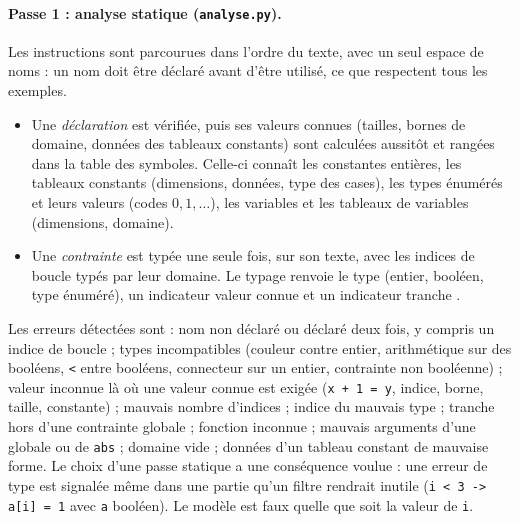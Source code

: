 \documentclass[11pt,a4paper]{article}
\newcommand{\code}[1]{\texttt{#1}}
\begin{document}
\paragraph{Passe 1 : analyse statique (\code{analyse.py}).} Les instructions sont parcourues
dans l'ordre du texte, avec un seul espace de noms : un nom doit être déclaré avant d'être
utilisé, ce que respectent tous les exemples.
\begin{itemize}
  \item Une \emph{déclaration} est vérifiée, puis ses valeurs connues (tailles, bornes de
        domaine, données des tableaux constants) sont calculées aussitôt et rangées dans la
        table des symboles. Celle-ci connaît les constantes entières, les tableaux constants
        (dimensions, données, type des cases), les types énumérés et leurs valeurs (codes
        $0, 1, \dots$), les variables et les tableaux de variables (dimensions, domaine).
  \item Une \emph{contrainte} est typée une seule fois, sur son texte, avec les indices de
        boucle typés par leur domaine. Le typage renvoie le type (entier, booléen, type
        énuméré), un indicateur \og valeur connue \fg{} et un indicateur \og tranche \fg.
\end{itemize}
Les erreurs détectées sont : nom non déclaré ou déclaré deux fois, y compris un indice de
boucle ; types incompatibles (couleur contre entier, arithmétique sur des booléens,
\code{<} entre booléens, connecteur sur un entier, contrainte non booléenne) ; valeur inconnue
là où une valeur connue est exigée (\code{x + 1 = y}, indice, borne, taille, constante) ;
mauvais nombre d'indices ; indice du mauvais type ; tranche hors d'une contrainte globale ;
fonction inconnue ; mauvais arguments d'une globale ou de \code{abs} ; domaine vide ; données
d'un tableau constant de mauvaise forme. Le choix d'une passe statique a une conséquence
voulue : une erreur de type est signalée même dans une partie qu'un filtre rendrait inutile
(\code{i < 3 -> a[i] = 1} avec \code{a} booléen). Le modèle est faux quelle que soit la
valeur de \code{i}.
\end{document}

